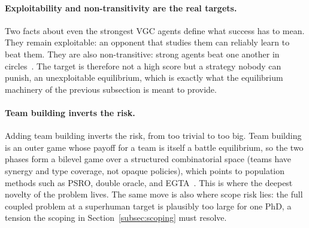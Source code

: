 \paragraph{Exploitability and non-transitivity are the real targets.}
Two facts about even the strongest VGC agents define what success has to mean.
They remain exploitable: an opponent that studies them can reliably learn to beat
them. They are also non-transitive: strong agents beat one another in
circles~\cite{angliss2026vgcbench}. The target is therefore not a high score but a
strategy nobody can punish, an unexploitable equilibrium, which is exactly what
the equilibrium machinery of the previous subsection is meant to provide.
\paragraph{Team building inverts the risk.}
Adding team building inverts the risk, from too trivial to too big. Team building
is an outer game whose payoff for a team is itself a battle equilibrium, so the two
phases form a bilevel game over a structured combinatorial space (teams have
synergy and type coverage, not opaque policies), which points to population methods
such as PSRO, double oracle, and EGTA~\cite{lanctot2017psro}. This is where the
deepest novelty of the problem lives. The same move is also where scope risk lies:
the full coupled problem at a superhuman target is plausibly too large for one PhD,
a tension the scoping in Section~\ref{subsec:scoping} must resolve.

